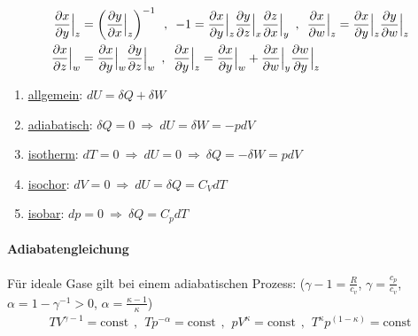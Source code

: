 

\begin{align*}
    \frac{\partial x}{\partial y} \Big|_z
    &= \left( \frac{\partial y}{\partial x} \Big|_z \right)^{-1}
    \hspace{5pt} , \hspace{5pt}
    - 1 = \frac{\partial x}{\partial y} \Big|_z \frac{\partial y}{\partial z} \Big|_x \frac{\partial z}{\partial x} \Big|_y
    \hspace{5pt} , \hspace{5pt}
    \frac{\partial x}{\partial w} \Big|_z = \frac{\partial x}{\partial y} \Big|_z \frac{\partial y}{\partial w} \Big|_z
    \\
    \frac{\partial x}{\partial z} \Big|_w &= \frac{\partial x}{\partial y} \Big|_w \frac{\partial y}{\partial z} \Big|_w
    \hspace{5pt} , \hspace{5pt}
    \frac{\partial x}{\partial y} \Big|_z = \frac{\partial x}{\partial y} \Big|_w + \frac{\partial x}{\partial w} \Big|_y \frac{\partial w}{\partial y} \Big|_z
\end{align*}

\begin{enumerate}[]
    \item \underline{allgemein}: $dU = \delta Q + \delta W$
    \item \underline{adiabatisch}: $\delta Q = 0 \ \Rightarrow \ dU = \delta W = - p dV$
    \item \underline{isotherm}: $dT = 0 \ \Rightarrow \ dU = 0 \ \Rightarrow \ \delta Q = - \delta W = p dV$
    \item \underline{isochor}: $d V = 0 \ \Rightarrow \ dU = \delta Q = C_V dT$
    \item \underline{isobar}: $dp = 0 \ \Rightarrow \ \delta Q = C_p dT$ 
\end{enumerate}

\paragraph{Adiabatengleichung}
Für ideale Gase gilt bei einem adiabatischen Prozess:
($\gamma - 1 = \frac{R}{c_v}$, $\gamma = \frac{c_p}{c_v}$, $\alpha = 1 - \gamma^{-1} > 0$,
$\alpha = \frac{\kappa - 1}{\kappa}$)
\vspace{-5pt}
\begin{align*}
    T V^{\gamma - 1} = \text{const}
    \hspace{5pt} , \hspace{5pt}
    T p^{-\alpha} = \text{const}
    \hspace{5pt} , \hspace{5pt}
    p V^\kappa = \text{const}
    \hspace{5pt} , \hspace{5pt}
    T^\kappa p^{(1-\kappa)} = \text{const}
\end{align*}
